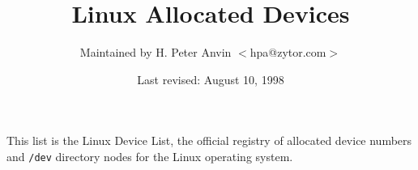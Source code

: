 \oddsidemargin=0in
\textwidth=6.5in
\topmargin=0in
\headheight=0.5in
\headsep=0.25in
\textheight=7.5in
\footskip=0.75in
\footheight=0.5in
%

\newcommand{\file}{\tt}			%
\newcommand{\url}{\it}		        %
\newcommand{\hex}{\tt}			%
\newcommand{\ud}{(Under development)}	%
\newcommand{\1}{\({}^1\)}
\newcommand{\2}{\({}^2\)}
\newcommand{\3}{\({}^3\)}
\newcommand{\4}{\({}^4\)}
\newlength{\dig}
\settowidth{\dig}{0}			%
\newcommand{\num}[2]{\makebox[#1\dig][r]{#2}}
\newcommand{\major}[4]{\num{3}{#1}#2 \> #3 \> #4 \\}
\newcommand{\minor}[3]{\> \> \num{3}{#1} \> {\file #2} \> #3 \\}
\newcommand{\minordots}{\> \> \> \dots \\}
\newenvironment{devicelist}%
 {\begin{tabbing}%
000--000 \= blockxxx \= 000 \= {\file /dev/input/keyboardxxx} \= foo \kill}%
 {\end{tabbing}}
\newcommand{\link}[4]{{\file #1} \> {\file #2} \> #3 \> #4 \\}
\newcommand{\vlink}[4]{{\file #1} \> {\em #2 \/} \> #3 \> #4 \\}
\newcommand{\node}[3]{{\file #1} \> #2 \> #3 \\}
\newcommand{\tum}{$''$}
\newenvironment{nodelist}%
 {\begin{tabbing}%
{\file /dev/crambamboli} \= {\file /proc/self/fd/99} \= symbolicxxx \=
foo \kill}%
 {\end{tabbing}}
%
%
\title{{\bf Linux Allocated Devices}}
\author{Maintained by H. Peter Anvin $<$hpa@zytor.com$>$}
\date{Last revised: August 10, 1998}
\maketitle
%
\noindent
This list is the Linux Device List, the official registry of allocated
device numbers and {\file /dev} directory nodes for the Linux
operating system.

